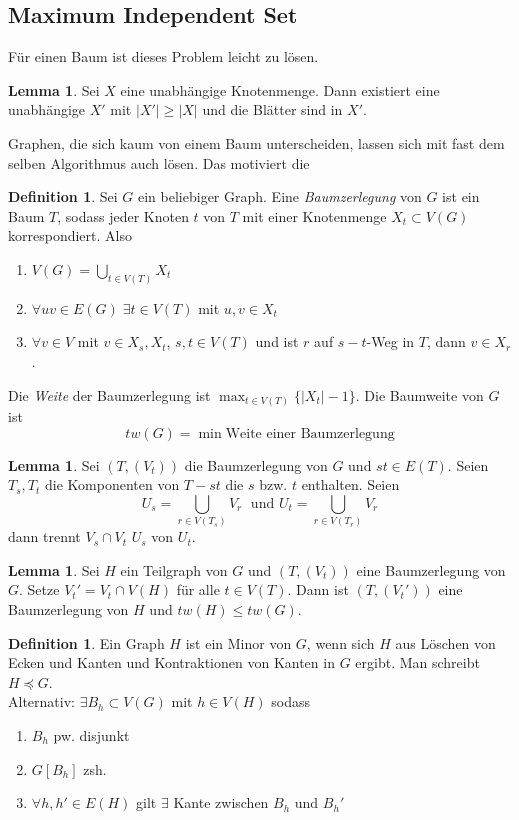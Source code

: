 \documentclass[a4paper, 12pt]{article}
\theoremstyle{plain}
\theoremstyle{definition}
\newtheorem{definition}[theorem]{Definition} %
\theoremstyle{lemma}
\newtheorem{lemma}[theorem]{Lemma}
\theoremstyle{remark}
\theoremstyle{corollary}
\theoremstyle{example}
\begin{document}
	\subsection{Maximum Independent Set}
	Für einen Baum ist dieses Problem leicht zu lösen.
	\begin{lemma}
		Sei $X$ eine unabhängige Knotenmenge. Dann existiert eine unabhängige $X'$ mit $\left|X'\right| \geq \left|X\right|$ und die Blätter sind in $X'$.
	\end{lemma}
	Graphen, die sich kaum von einem Baum unterscheiden, lassen sich mit fast dem selben Algorithmus auch lösen. Das motiviert die 
	\begin{definition}
		Sei $G$ ein beliebiger Graph. Eine \textit{Baumzerlegung} von $G$ ist ein Baum $T$, sodass jeder Knoten $t$ von $T$ mit einer Knotenmenge $X_t \subset V(G)$ korrespondiert. Also \begin{enumerate}
			\item $V(G) = \bigcup_{t \in V(T)} X_t$
			\item $\forall uv \in E(G) \; \exists t \in V(T)$ mit $u,v \in X_t$
			\item $\forall v \in V$ mit $v \in X_s,X_t$, $s,t\in V(T)$ und ist $r$ auf $s-t$-Weg in $T$, dann $v \in X_r$.
		\end{enumerate}
		Die \textit{Weite} der Baumzerlegung ist $\max_{t \in V(T)} \{\left|X_t\right|-1\}$. Die Baumweite von $G$ ist \[tw(G) = \min \text{Weite einer Baumzerlegung}\]
	\end{definition}
	\begin{lemma}
		Sei $(T,(V_t))$ die Baumzerlegung von $G$ und $st \in E(T)$. Seien $T_s,T_t$ die Komponenten von $T-st$ die $s$ bzw. $t$ enthalten. Seien \[U_s = \bigcup_{r \in V(T_s)} V_r \; \text{ und } U_t = \bigcup_{r \in V(T_r)} V_r\] dann trennt $V_s \cap V_t$ $U_s$ von $U_t$. 
	\end{lemma}
	\begin{lemma}
		Sei $H$ ein Teilgraph von $G$ und $(T,(V_t))$ eine Baumzerlegung von $G$. Setze $V_t' = V_t \cap V(H)$ für alle $t \in V(T)$. Dann ist $(T,(V_t'))$ eine Baumzerlegung von $H$ und $tw(H)\leq tw(G)$. 
	\end{lemma}
	\begin{definition}
		Ein Graph $H$ ist ein Minor von $G$, wenn sich $H$ aus Löschen von Ecken und Kanten und Kontraktionen von Kanten in $G$ ergibt. Man schreibt $H\preceq G$.\\
		Alternativ: $\exists B_h \subset V(G)$ mit $h \in V(H)$ sodass \begin{enumerate}
			\item $B_h$ pw. disjunkt
			\item $G[B_h]$ zsh.
			\item $\forall h,h' \in E(H)$ gilt $\exists$ Kante zwischen $B_h$ und $B_h'$
		\end{enumerate}
	\end{definition}
\end{document}
